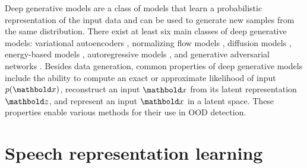 Deep generative models are a class of models that learn a probabilistic representation of the input data and can be used to generate new samples from the same distribution. 
There exist at least six main classes of deep generative models: variational autoencoders \cite{kingma_autoencoding_2014,rezende_stochastic_2014,ranganath_hierarchical_2016,vahdat_nvae_2020,child_very_2021}, normalizing flow models \cite{dinh_nice_2015,rezende_variational_2015,dinh_density_2017,kingma_glow_2018,grathwohl_ffjord_2018}, diffusion models \cite{sohl-dickstein_deep_2015,song_generative_2019, ho_denoising_2020, vahdat_scorebased_2021}, energy-based models \cite{lecun_tutorial_2006,hinton_fast_2006,salakhutdinov_efficient_2010,du_implicit_2019}, autoregressive models \cite{oord_conditional_2016,oord_wavenet_2016,radford_improving_2018}, and generative adversarial networks \cite{goodfellow_generative_2014,arjovsky_wasserstein_2017,brock_large_2019,karras_stylebased_2019}.
Besides data generation, common properties of deep generative models include the ability to compute an exact or approximate likelihood of input $p(\xb)$, reconstruct an input $\xb$ from its latent representation $\zb$, and represent an input $\xb$ in a latent space. These properties enable various methods for their use in OOD detection. 





\section{Speech representation learning}



\iffalse


